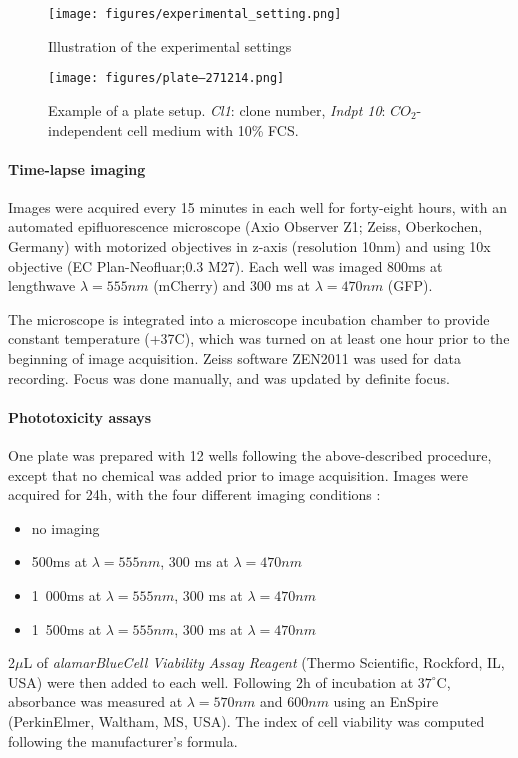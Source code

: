 \begin{figure}
\centering
\texttt{[image: figures/experimental\_setting.png]}
\caption{Illustration of the experimental settings}
\label{exp_setting}
\end{figure}
\begin{figure}
\centering
\texttt{[image: figures/plate--271214.png]}
\caption{Example of a plate setup. \textit{Cl1}: clone number, \textit{Indpt 10}: $CO_2$-independent cell medium with 10\% FCS.}
\label{plate_setup}
\end{figure}
\paragraph{Time-lapse imaging}
Images were acquired every 15 minutes in each well for forty-eight hours, with an automated epifluorescence microscope (Axio Observer Z1; Zeiss, Oberkochen, Germany) with motorized objectives in z-axis (resolution 10nm) and using 10x objective (EC Plan-Neofluar;0.3 M27). Each well was imaged 800ms at lengthwave $\lambda = 555nm$ (mCherry) and 300 ms at $\lambda = 470nm$ (GFP).

The microscope is integrated into a microscope incubation chamber to provide constant temperature (+37C), which was turned on at least one hour prior to the beginning of image acquisition. Zeiss software ZEN2011 was used for data recording. Focus was done manually, and was updated by definite focus.
\paragraph{Phototoxicity assays}
One plate was prepared with 12 wells following the above-described procedure, except that no chemical was added prior to image acquisition. Images were acquired for 24h, with the four different imaging conditions :
\begin{itemize}
\item no imaging
\item 500ms at $\lambda = 555nm$, 300 ms at $\lambda = 470nm$
\item 1~000ms at $\lambda = 555nm$, 300 ms at $\lambda = 470nm$
\item 1~500ms at $\lambda = 555nm$, 300 ms at $\lambda = 470nm$
\end{itemize}
2$\mu$L of \textit{alamarBlue\texttrademark Cell Viability Assay Reagent} (Thermo Scientific, Rockford, IL, USA) were then added to each well. Following 2h of incubation at $37^\circ$C, absorbance was measured at $\lambda = 570nm$ and $600nm$ using an EnSpire\up{\textregistered} (PerkinElmer, Waltham, MS, USA). The index of cell viability was computed following the manufacturer's formula.

